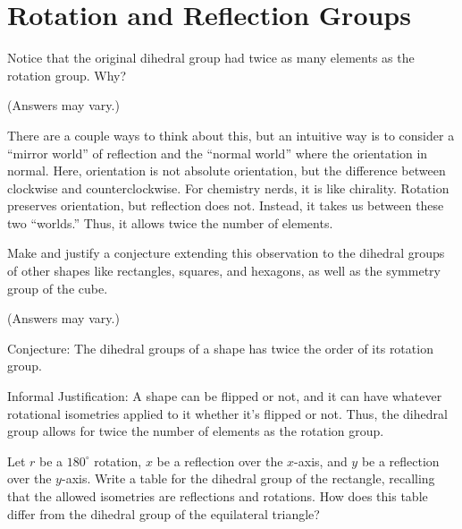 \documentclass[../key.tex]{subfiles}
\begin{document}
\section{Rotation and Reflection Groups}

\begin{outer_problem}[start=1]
\item Notice that the original dihedral group had twice as many elements as the rotation group. Why?
\end{outer_problem}

\noindent(Answers may vary.)

There are a couple ways to think about this, but an intuitive way is to consider a ``mirror world'' of reflection and the ``normal world'' where the orientation in normal. Here, orientation is not absolute orientation, but the difference between clockwise and counterclockwise. For chemistry nerds, it is like chirality. Rotation preserves orientation, but reflection does not. Instead, it takes us between these two ``worlds.'' Thus, it allows twice the number of elements.

\begin{outer_problem}
\item Make and justify a conjecture extending this observation to the dihedral groups of other shapes like rectangles, squares, and hexagons, as well as the symmetry group of the cube.
\end{outer_problem}

\noindent(Answers may vary.)

Conjecture: The dihedral groups of a shape has twice the order of its rotation group.

Informal Justification: A shape can be flipped or not, and it can have whatever rotational isometries applied to it whether it's flipped or not. Thus, the dihedral group allows for twice the number of elements as the rotation group.

\begin{outer_problem}
\item Let $r$ be a $180^{\circ}$ rotation, $x$ be a reflection over the $x$-axis, and $y$ be a reflection over the $y$-axis. Write a table for the dihedral group of the rectangle, recalling that the allowed isometries are reflections and rotations. How does this table differ from the dihedral group of the equilateral triangle? \label{prob:rectangle_group}
\end{outer_problem}
\end{document}
